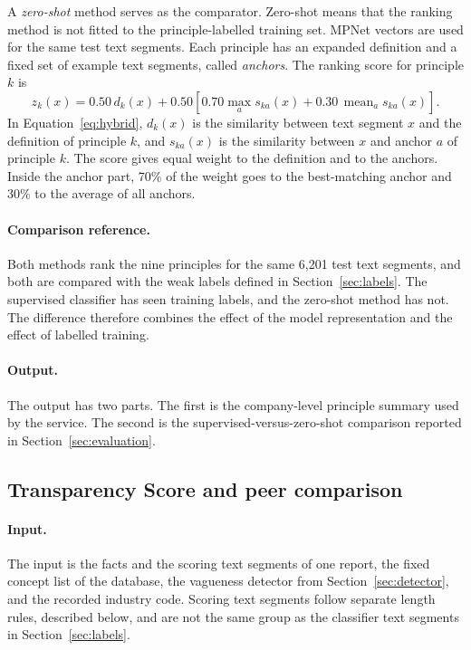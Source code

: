 A \emph{zero-shot} method serves as the comparator. Zero-shot means that the ranking method is not fitted to the principle-labelled training set. MPNet vectors are used for the same test text segments. Each principle has an expanded definition and a fixed set of example text segments, called \emph{anchors}. The ranking score for principle $k$ is
\begin{equation}
z_k(x)=0.50\,d_k(x)+0.50\left[0.70\max_a s_{ka}(x)+0.30\,\operatorname{mean}_a s_{ka}(x)\right].
\label{eq:hybrid}
\end{equation}
In Equation~\eqref{eq:hybrid}, $d_k(x)$ is the similarity between text segment $x$ and the definition of principle $k$, and $s_{ka}(x)$ is the similarity between $x$ and anchor $a$ of principle $k$. The score gives equal weight to the definition and to the anchors. Inside the anchor part, 70\% of the weight goes to the best-matching anchor and 30\% to the average of all anchors.

\paragraph{Comparison reference.} Both methods rank the nine principles for the same 6,201 test text segments, and both are compared with the weak labels defined in Section~\ref{sec:labels}. The supervised classifier has seen training labels, and the zero-shot method has not. The difference therefore combines the effect of the model representation and the effect of labelled training.

\paragraph{Output.} The output has two parts. The first is the company-level principle summary used by the service. The second is the supervised-versus-zero-shot comparison reported in Section~\ref{sec:evaluation}.

\subsection{Transparency Score and peer comparison}
\label{sec:score}

\paragraph{Input.} The input is the facts and the scoring text segments of one report, the fixed concept list of the database, the vagueness detector from Section~\ref{sec:detector}, and the recorded industry code. Scoring text segments follow separate length rules, described below, and are not the same group as the classifier text segments in Section~\ref{sec:labels}.

